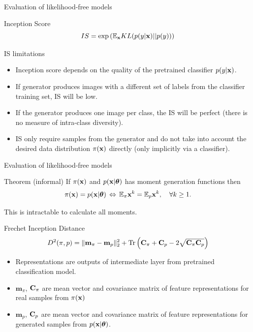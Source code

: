 \begin{frame}{Evaluation of likelihood-free models}
	\begin{block}{Inception Score}
		\vspace{-0.1cm}
		\[
			IS =  \exp \left( \mathbb{E}_{\mathbf{x}} KL(p(y | \mathbf{x}) || p(y)) \right)
		\]
		\vspace{-0.1cm}
	\end{block}
	\begin{block}{IS limitations}
		\begin{itemize}
			\item Inception score depends on the quality of the pretrained classifier $p(y | \mathbf{x})$.
			\item If generator produces images with a different set of labels from the classifier training set, IS will be low.
			\item If the generator produces one image per class, the IS will be perfect (there is no measure of intra-class diversity).
			\item IS only require samples from the generator and do not take into account the desired data distribution $\pi(\mathbf{x})$ directly (only implicitly via a classifier).
		\end{itemize}
	\end{block}
\end{frame}
\begin{frame}{Evaluation of likelihood-free models}
	\begin{block}{Theorem (informal)}
		If $\pi(\mathbf{x})$ and $p(\mathbf{x} | \boldsymbol{\theta})$ has moment generation functions then
		\vspace{-0.1cm}
		\[
			\pi(\mathbf{x}) = p(\mathbf{x} | \boldsymbol{\theta}) \, \Leftrightarrow \, \mathbb{E}_{\pi} \mathbf{x}^k = \mathbb{E}_{p} \mathbf{x}^k, \quad \forall k \geq 1.
		\]
		\vspace{-0.7cm}
	\end{block}
	This is intractable to calculate all moments.
	\begin{block}{Frechet Inception Distance}
		\vspace{-0.3cm}
		\[
			D^2 (\pi, p) = \| \mathbf{m}_{\pi} - \mathbf{m}_{p}\|_2^2 + \text{Tr} \left( \mathbf{C}_{\pi} + \mathbf{C}_p - 2 \sqrt{\mathbf{C}_{\pi} \mathbf{C}_p} \right)
		\]
		\vspace{-0.5cm}
	\end{block}
	\begin{itemize}
		\item Representations are outputs of intermediate layer from pretrained classification model.
		\item $\mathbf{m}_{\pi}$, $\mathbf{C}_{\pi} $ are mean vector and covariance matrix of feature representations for real samples from $\pi(\mathbf{x})$
		\item $\mathbf{m}_{p}$, $\mathbf{C}_p$ are mean vector and covariance matrix of feature representations for generated samples from $p(\mathbf{x} | \boldsymbol{\theta})$.
	\end{itemize} 

\end{frame}
